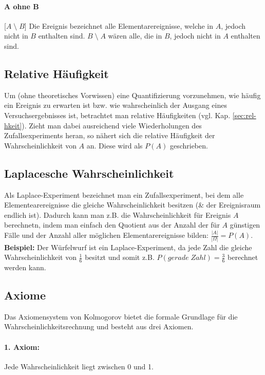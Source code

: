 \documentclass[a4paper]{article}
\begin{document}
\paragraph{A ohne B} [$A\; \setminus\; B$]\; Die Ereignis bezeichnet alle Elementarereignisse, welche in $A$, jedoch nicht in $B$ enthalten sind. $B\; \setminus\; A$ wären alle, die in $B$, jedoch nicht in $A$ enthalten sind.


\subsection{Relative Häufigkeit}
Um (ohne theoretisches Vorwissen) eine Quantifizierung vorzunehmen, wie häufig ein Ereignis zu erwarten ist bzw. wie wahrscheinlich der Ausgang eines Versuchsergebnisses ist, betrachtet man relative Häufigkeiten (vgl. Kap. \ref{sec:rel-hkeit}).
Zieht man dabei ausreichend viele Wiederholungen des Zufallsexperiments heran, so nähert sich die relative Häufigkeit der Wahrscheinlichkeit von $A$ an. Diese wird als $P(A)$ geschrieben.

\subsection{Laplacesche Wahrscheinlichkeit}\label{sec:laplace}
Als Laplace-Experiment bezeichnet man ein Zufallsexperiment, bei dem alle Elementearereignisse die gleiche Wahrscheinlichkeit besitzen (\& der Ereignisraum endlich ist). Dadurch kann man z.B. die Wahrscheinlichkeit für Ereignis $A$ berechnetn, indem man einfach den Quotient aus der Anzahl der für $A$ günstigen Fälle und der Anzahl aller möglichen Elementarereignisse bilden: $\frac{|A|}{|\Omega|}=P(A)$.\\
\textbf{Beispiel:} Der Würfelwurf ist ein Laplace-Experiment, da jede Zahl die gleiche Wahrscheinlichkeit von $\frac{1}{6}$ besitzt und somit z.B. $P(gerade\; Zahl) = \frac{3}{6}$ berechnet werden kann.

\subsection{Axiome} \label{sec:axiome}
Das Axiomensystem von Kolmogorov bietet die formale Grundlage für die Wahrscheinlichkeitsrechnung und besteht aus drei Axiomen.

\paragraph{1. Axiom:} Jede Wahrscheinlichkeit liegt zwischen 0 und 1.
\end{document}
